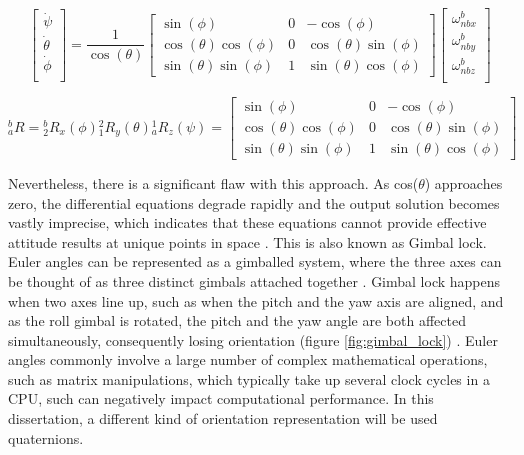 \begin{equation}
    \begin{bmatrix}
        \dot{\psi}   \\
        \dot{\theta} \\
        \dot{\phi}   \\
    \end{bmatrix}
    =
    \frac{1}{\cos(\theta)}
    \begin{bmatrix}
        \sin(\phi)             & 0 & -\cos(\phi)            \\
        \cos(\theta)\cos(\phi) & 0 & \cos(\theta)\sin(\phi) \\
        \sin(\theta)\sin(\phi) & 1 & \sin(\theta)\cos(\phi)
    \end{bmatrix}
    \begin{bmatrix}
        \omega{^b_{nbx}} \\
        \omega{^b_{nby}} \\
        \omega{^b_{nbz}} \\
    \end{bmatrix}
    \label{eq:euler_equation}
\end{equation}

\begin{equation}
    {^b_a}R = {^b_2}R_x(\phi){^2_1}R_y(\theta){^1_a}R_z(\psi)
    =
    \begin{bmatrix}
        \sin(\phi)             & 0 & -\cos(\phi)            \\
        \cos(\theta)\cos(\phi) & 0 & \cos(\theta)\sin(\phi) \\
        \sin(\theta)\sin(\phi) & 1 & \sin(\theta)\cos(\phi)
    \end{bmatrix}
    \label{eq:euler_equations}
\end{equation}

Nevertheless, there is a significant flaw with this approach. As cos($\theta$) approaches zero, the differential equations degrade rapidly and the output solution becomes vastly imprecise, which indicates that these equations cannot provide effective attitude results at unique points in space \cite{spring1986euler}. This is also known as Gimbal lock. Euler angles can be represented as a gimballed system, where the three axes can be thought of as three distinct gimbals attached together \cite{mcconnell1967kinematics}. Gimbal lock happens when two axes line up, such as when the pitch and the yaw axis are aligned, and as the roll gimbal is rotated, the pitch and the yaw angle are both affected simultaneously, consequently losing orientation (figure \ref{fig:gimbal_lock}) \cite{hemingway2018perspectives}.
Euler angles commonly involve a large number of complex mathematical operations, such as matrix manipulations, which typically take up several clock cycles in a CPU, such can negatively impact computational performance. In this dissertation, a different kind of orientation representation will be used quaternions.

